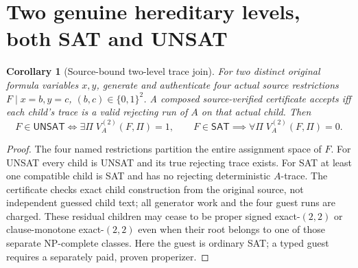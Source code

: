 \documentclass[11pt]{article}
\newtheorem{corollary}[theorem]{Corollary}
\newcommand{\SAT}{\mathsf{SAT}}
\newcommand{\UNSAT}{\mathsf{UNSAT}}
\begin{document}
\section{Two genuine hereditary levels, both SAT and UNSAT}
\begin{corollary}[Source-bound two-level trace join]\label{cor:two}
For two distinct original formula variables $x,y$, generate and
authenticate four actual source restrictions $F\mid x=b,y=c$,
$(b,c)\in\{0,1\}^2$. A composed source-verified certificate accepts
iff each child's trace is a valid rejecting run of $A$ on that
actual child. Then
\[
 F\in\UNSAT\iff\exists\Pi\;V_A^{(2)}(F,\Pi)=1,\qquad
 F\in\SAT\implies\forall\Pi\;V_A^{(2)}(F,\Pi)=0.
\]
\end{corollary}
\begin{proof}
The four named restrictions partition the entire assignment space
of $F$. For UNSAT every child is UNSAT and its true rejecting
trace exists. For SAT at least one compatible child is SAT and has
no rejecting deterministic $A$-trace. The certificate checks exact
child construction from the original source, not independent guessed
child text; all generator work and the four guest runs are charged.
These residual children may cease to be proper signed exact-$(2,2)$
or clause-monotone exact-$(2,2)$ even when their root belongs to one
of those separate NP-complete classes. Here the guest is ordinary
SAT; a typed guest requires a separately paid, proven properizer.
\end{proof}
\end{document}

